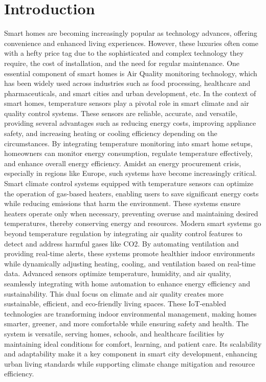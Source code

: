 \documentclass[USenglish,oneside,twocolumn]{article}
\begin{document}
\section{Introduction}
Smart homes are becoming increasingly popular as technology advances, offering convenience and enhanced living experiences. However, these luxuries often come with a hefty price tag due to the sophisticated and complex technology they require, the cost of installation, and the need for regular maintenance.\cite{alam_2024_ambientiq}\cite{barot_2020_towards} One essential component of smart homes is Air Quality monitoring technology, which has been widely used across industries such as food processing, healthcare and pharmaceuticals, and smart cities and urban development, etc. In the context of smart homes, temperature sensors play a pivotal role in smart climate and air quality control systems. These sensors are reliable, accurate, and versatile, providing several advantages such as reducing energy costs, improving appliance safety, and increasing heating or cooling efficiency depending on the circumstances. By integrating temperature monitoring into smart home setups,\cite{barot_2020_air} homeowners can monitor energy consumption, regulate temperature effectively, and enhance overall energy efficiency. Amidst an energy procurement crisis, especially in regions like Europe, such systems have become increasingly critical. Smart climate control systems equipped with temperature sensors can optimize the operation of gas-based heaters, enabling users to save significant energy costs while reducing emissions that harm the environment. These systems ensure heaters operate only when necessary, preventing overuse and maintaining desired temperatures, thereby conserving energy and resources. Modern smart systems go beyond temperature regulation by integrating air quality control features to detect and address harmful gases like CO2.\cite{adhiwibowo_2020_temperature} By automating ventilation and providing real-time alerts, these systems promote healthier indoor environments while dynamically adjusting heating, cooling, and ventilation based on real-time data. Advanced sensors optimize temperature, humidity, and air quality, seamlessly integrating with home automation to enhance energy efficiency and sustainability. This dual focus on climate and air quality creates more sustainable, efficient, and eco-friendly living spaces. These IoT-enabled technologies are transforming indoor environmental management, making homes smarter, greener, and more comfortable while ensuring safety and health. The system is versatile, serving homes, schools, and healthcare facilities by maintaining ideal conditions for comfort, learning, and patient care. Its scalability and adaptability make it a key component in smart city development, enhancing urban living standards while supporting climate change mitigation and resource efficiency.\cite{fisk_2015_review}
\end{document}

